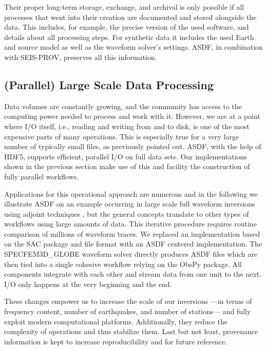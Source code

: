 Their proper long-term storage, exchange, and archival is only possible if all
processes that went into their creation are documented and stored alongside the
data. This includes, for example, the precise version of the used software, and
details about all processing steps. For synthetic data it includes the used
Earth and source model as well as the waveform solver's settings. ASDF, in
combination with SEIS-PROV, preserves all this information.


\subsection{(Parallel) Large Scale Data Processing}

Data volumes are constantly growing, and the community has access to the
computing power needed to process and work with it. However, we are at a point
where I/O itself, i.e., reading and writing from and to disk, is one of the
most expensive parts of many operations. This is especially true for a very
large number of typically small files, as previously pointed out.  ASDF, with
the help of HDF5, supports efficient, parallel I/O on full data sets. Our
implementations shown in the previous section make use of this and facility the
construction of fully parallel workflows.

Applications for this operational approach are numerous and in the following we
illustrate ASDF on an example occurring in large scale full waveform inversions
using adjoint techniques \cite{Tromp2005, Fichtner2006, Tape2010}, but the
general concepts translate to other types of workflows using large
amounts of data. This iterative procedure requires routine comparison of
millions of waveform traces. We replaced an implementation based on the SAC
package and file format \cite{HelffrichWookeyBastow201311} with an ASDF
centered implementation. The SPECFEM3D\_GLOBE waveform solver
\cite{KoTr02a, KoTr02b}
directly produces ASDF files which are then tied into a single
cohesive workflow relying on the ObsPy \cite{obspy2010} package.  All
components integrate with each other and stream data from one unit to the next.
I/O only happens at the very beginning and the end.

These changes empower us to increase the scale of our inversions ---in terms of
frequency content, number of earthquakes, and number of stations--- and fully
exploit modern computational platforms. Additionally, they reduce the
complexity of operations and thus stabilize them. Last but not least,
provenance information is kept to increase reproducibility and for future
reference.


